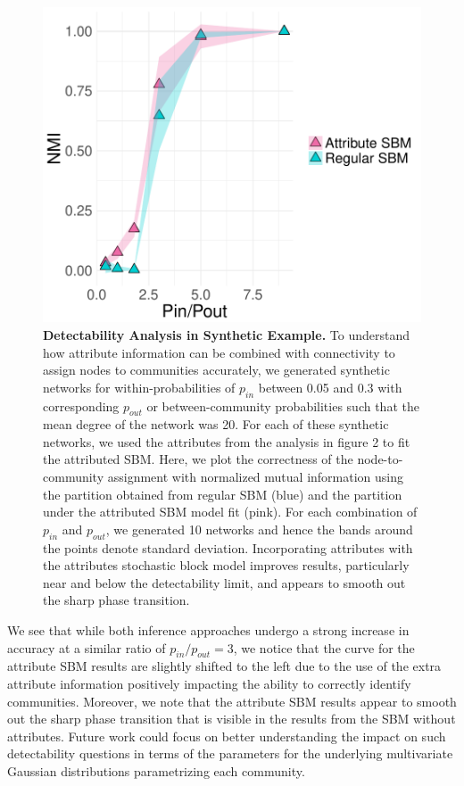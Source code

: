 \begin{figure}[h!]
\begin{center}
\includegraphics[width=1\textwidth]{DetectExp.pdf}
\caption{{\bf Detectability Analysis in Synthetic Example.} To understand how attribute information can be combined with connectivity to assign nodes to communities accurately, we generated synthetic networks for within-probabilities of $p_{in}$ between 0.05 and 0.3 with corresponding $p_{out}$ or between-community probabilities such that the mean degree of the network was 20. For each of these synthetic networks, we used the attributes from the analysis in figure 2 to fit the attributed SBM. Here, we plot the correctness of the node-to-community assignment with normalized mutual information using the partition obtained from regular SBM (blue) and the partition under the attributed SBM model fit (pink). For each combination of $p_{in}$ and $p_{out}$, we generated 10 networks and hence the bands around the points denote standard deviation. Incorporating attributes with the attributes stochastic block model improves results, particularly near and below the detectability limit, and appears to smooth out the sharp phase transition. }
\label{Fig3}
\end{center}
\end{figure}

We see that while both inference approaches undergo a strong increase in accuracy at a similar ratio of $p_{in}/p_{out}=3$, we notice that the curve for the attribute SBM results are slightly shifted to the left due to the use of the extra attribute information positively impacting the ability to correctly identify communities. Moreover, we note that the attribute SBM results appear to smooth out the sharp phase transition that is visible in the results from the SBM without attributes. Future work could focus on better understanding the impact on such detectability questions in terms of the parameters for the underlying multivariate Gaussian distributions parametrizing each community. %

